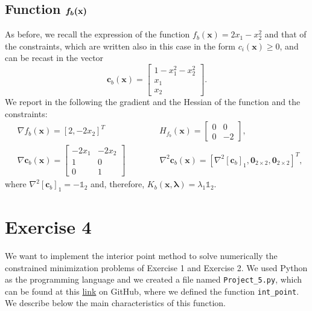 \documentclass[a4paper,11pt]{article}
\begin{document}
\subsection*{Function $\boldmath{f_{b}}(\textbf{x})$}
As before, we recall the expression of the function $f_{b}(\textbf{x}) = 2x_{1} - x_{2}^{2}$ and that of the constraints, which are written also in this case in the form $c_{i}(\textbf{x})\ge0$, and can be recast in the vector
\begin{equation}
	\textbf{c}_{b}(\textbf{x}) = 
	\begin{bmatrix}
		1 -x_{1}^{2} - x_2^{2}\\
		x_1\\
		x_2
	\end{bmatrix}.
\end{equation}
We report in the following the gradient and the Hessian of the function and the constraints:
\begin{align}
	& \nabla f_{b}(\textbf{x}) = [2, -2x_{2}]^{T} \qquad \qquad \qquad \ \ H_{f_{b}}(\textbf{x}) = \begin{bmatrix}
		0 & 0 \\
		0 & -2
	\end{bmatrix}, \\
	& \nabla \textbf{c}_{b}(\textbf{x}) = \begin{bmatrix}
		-2x_{1} & - 2x_{2}\\
		1 & 0 \\
		0 & 1
	\end{bmatrix} \qquad \qquad \nabla^{2}{\textbf{c}_{b}}(\textbf{x}) =  \left[\nabla^{2}[\textbf{c}_{b}]_{1},\textbf{0}_{2\times2},\textbf{0}_{2\times2}\right]^{T},
\end{align}
where $\nabla^{2}[\textbf{c}_{b}]_{1} = -\mathbb{1}_{2}$ and, therefore, $K_{b}(\textbf{x},\boldsymbol{\lambda})=\lambda_{1}\mathbb{1}_{2}$.

\section*{Exercise 4}
We want to implement the interior point method to solve numerically the constrained minimization problems of Exercise 1 and Exercise 2. We used Python as the programming language and we created a file named \texttt{Project_5.py}, which can be found at this \href{https://github.com/nunziacerrato/Numerical_Analysis_Optimization/blob/main/Project_5/Project_5.py}{link} on GitHub, where we defined the function \texttt{int_point}. We describe below the main characteristics of this function. \\
%
%
\end{document}
